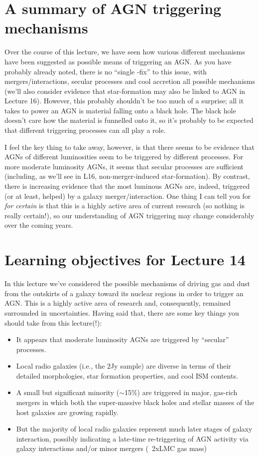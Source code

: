 \documentclass[11pt]{article}
\begin{document}
\section{A summary of AGN triggering mechanisms}
Over the course of this lecture, we have seen how various different
mechanisms have been suggested as possible means of triggering an
AGN. As you have probably already noted, there is no ``single -fix''
to this issue, with mergers/interactions, secular processes and cool
accretion all possible mechanisms (we'll also consider evidence that
star-formation may also be linked to AGN in Lecture 16). However, this
probably shouldn't be too much of a surprise; all it takes to power an
AGN is material falling onto a black hole. The black hole doesn't care
how the material is funnelled onto it, so it's probably to be expected
that different triggering processes can all play a role.

I feel the key thing to take away, however, is that there seems to be
evidence that AGNs of different luminosities seem to be triggered by
different processes. For more moderate luminosity AGNs, it seems that
secular processes are sufficient (including, as we'll see in L16,
non-merger-induced star-formation). By contrast, there is increasing
evidence that the most luminous AGNs are, indeed, triggered (or at
least, helped) by a galaxy merger/interaction. One thing I can tell
you for {\it for certain} is that this is a highly active area of
current research (so nothing is really certain!), so our understanding
of AGN triggering may change considerably over the coming years.

\section{Learning objectives for Lecture 14}
In this lecture we've considered the possible mechanisms of driving
gas and dust from the outskirts of a galaxy toward its nuclear regions
in order to trigger an AGN. This is a highly active area of research
and, consequently, remained surrounded in uncertainties. Having said
that, there are some key things you should take from this lecture(!):
\begin{itemize}
\item It appears that moderate luminosity AGNs are triggered by
  ``secular'' processes.
\item Local radio galaxies (i.e., the 2Jy sample) are diverse in terms
  of their detailed morphologies, star formation properties, and cool
  ISM contents.
\item A small but significant minority ($\sim$15\%) are triggered in
  major, gas-rich mergers in which both the super-massive black holes
  and stellar masses of the host galaxies are growing rapidly.
\item But the majority of local radio galaxies represent much later
  stages of galaxy interaction, possibly indicating a late-time
  re-triggering of AGN activity via galaxy interactions and/or minor
  mergers (~2xLMC gas mass)
\end{itemize}
\end{document}
